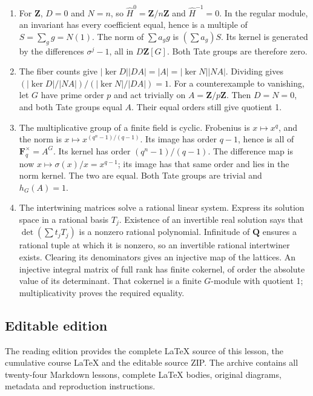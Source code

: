 \documentclass[11pt,a4paper]{article}
\newcommand{\tightlist}{\setlength{\itemsep}{0pt}\setlength{\parskip}{0pt}}
\begin{document}
\begin{enumerate}
\def\labelenumi{\arabic{enumi}.}
\tightlist
\item
  For \(\mathbf Z\), \(D=0\) and \(N=n\), so
  \(\widehat H^0=\mathbf Z/n\mathbf Z\) and \(\widehat H^{-1}=0\). In
  the regular module, an invariant has every coefficient equal, hence is
  a multiple of \(S=\sum_g g=N(1)\). The norm of \(\sum a_g g\) is
  \((\sum a_g)S\). Its kernel is generated by the differences
  \(\sigma^j-1\), all in \(D\mathbf Z[G]\). Both Tate groups are
  therefore zero.
\item
  The fiber counts give \(|\ker D||DA|=|A|=|\ker N||NA|\). Dividing
  gives \((|\ker D|/|NA|)/(|\ker N|/|DA|)=1\). For a counterexample to
  vanishing, let \(G\) have prime order \(p\) and act trivially on
  \(A=\mathbf Z/p\mathbf Z\). Then \(D=N=0\), and both Tate groups equal
  \(A\). Their equal orders still give quotient 1.
\item
  The multiplicative group of a finite field is cyclic. Frobenius is
  \(x\mapsto x^q\), and the norm is \(x\mapsto x^{(q^n-1)/(q-1)}\). Its
  image has order \(q-1\), hence is all of \(\mathbf F_q^\times=A^G\).
  Its kernel has order \((q^n-1)/(q-1)\). The difference map is now
  \(x\mapsto\sigma(x)/x=x^{q-1}\); its image has that same order and
  lies in the norm kernel. The two are equal. Both Tate groups are
  trivial and \(h_G(A)=1\).
\item
  The intertwining matrices solve a rational linear system. Express its
  solution space in a rational basis \(T_j\). Existence of an invertible
  real solution says that \(\det(\sum t_jT_j)\) is a nonzero rational
  polynomial. Infinitude of \(\mathbf Q\) ensures a rational tuple at
  which it is nonzero, so an invertible rational intertwiner exists.
  Clearing its denominators gives an injective map of the lattices. An
  injective integral matrix of full rank has finite cokernel, of order
  the absolute value of its determinant. That cokernel is a finite
  \(G\)-module with quotient 1; multiplicativity proves the required
  equality.
\end{enumerate}

\subsection{Editable edition}\label{editable-edition}

The reading edition provides the complete LaTeX source of this lesson,
the cumulative course LaTeX and the editable source ZIP. The archive
contains all twenty-four Markdown lessons, complete LaTeX bodies,
original diagrams, metadata and reproduction instructions.
\end{document}
